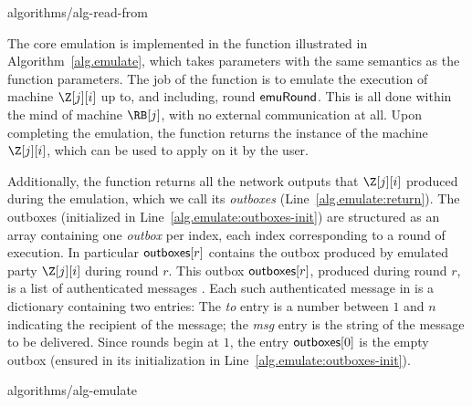 {algorithms/alg-read-from}

The core emulation is implemented in the function \emulate illustrated in
Algorithm~\ref{alg.emulate}, which takes parameters with the same semantics as
the \emulationSnapshot function parameters. The job of the \emulate function
is to emulate the execution of machine $\Z[j][i]$ up to, and including, round
$\textsf{emuRound}$. This is all done within the mind of machine $\RB[j]$,
with no external communication at all. Upon completing the emulation,
the \emulate function returns the instance of the machine $\Z[j][i]$,
which can be used to apply \lread on it by the user.

Additionally, the
\emulate function returns all the network outputs that $\Z[j][i]$
produced during the emulation, which we call its \emph{outboxes}
(Line~\ref{alg.emulate:return}). The outboxes (initialized in
Line~\ref{alg.emulate:outboxes-init}) are structured as an array
containing one \emph{outbox} per index, each index corresponding to
a round of execution. In particular $\textsf{outboxes}[r]$ contains the
outbox produced by emulated party $\Z[j][i]$ during round $r$.
This outbox $\textsf{outboxes}[r]$, produced during round $r$, is a list
of authenticated messages \netouts. Each such authenticated
message \netout in \netouts is a dictionary containing two entries:
The \emph{to} entry is a number between $1$ and $n$
indicating the recipient of the message; the \emph{msg}
entry is the string of the message to be delivered.
Since rounds begin at $1$, the entry $\textsf{outboxes}[0]$ is the
empty outbox (ensured in its initialization in
Line~\ref{alg.emulate:outboxes-init}).

{algorithms/alg-emulate}

